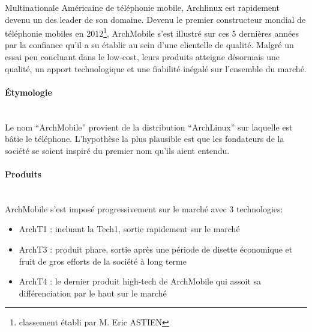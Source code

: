 Multinationale Américaine de téléphonie mobile, Archlinux 
est rapidement devenu un des leader de son domaine.
Devenu le premier constructeur mondial de téléphonie mobiles 
en 2012\footnote{classement établi par M. Eric ASTIEN},
ArchMobile s'est illustré sur ces 5 dernières années par
la confiance qu'il a su établir au sein d'une clientelle 
de qualité. Malgré un essai peu concluant dans le low-cost,
leurs produits atteigne désormais une qualité, un apport
technologique et une fiabilité inégalé sur l'ensemble du
marché.

\paragraph{\'Etymologie}~\\
Le nom ``ArchMobile'' provient de la distribution ``ArchLinux''
sur laquelle est bâtie le téléphone. L'hypothèse la plus plausible
est que les fondateurs de la société se soient inspiré du premier
nom qu'ils aient entendu.

\paragraph{Produits}~\\
ArchMobile s'est imposé progressivement sur le marché avec 3 technologies:
\begin{itemize}
\item ArchT1 : incluant la Tech1, sortie rapidement sur le marché
\item ArchT3 : produit phare, sortie après une période de disette 
  économique et fruit de gros efforts de la société à long terme
\item ArchT4 : le dernier produit high-tech de ArchMobile qui assoit
  sa différenciation par le haut sur le marché
\end{itemize}
